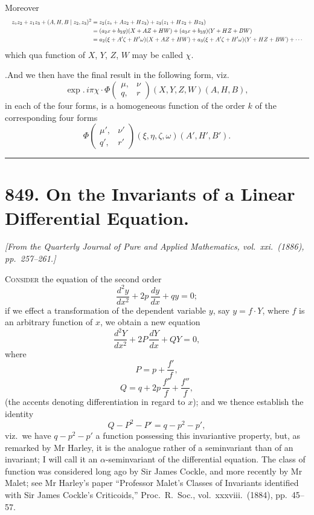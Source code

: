 \documentclass[11pt]{article}
\begin{document}
Moreover
\[
\resizebox{\textwidth}{!}{$\displaystyle
\begin{aligned}
z_{\circ}z_2+z_1z_3+(A,H,B\mid z_2,z_3)^2 &= z_2(z_{\circ}+Az_2+Hz_3) + z_3(z_1+Hz_2+Bz_3)\\
&= (a_2x+b_2y)(X+AZ+HW) + (a_3x+b_3y)(Y+HZ+BW)\\
&= a_2(\xi+A'\zeta+H'\omega)(X+AZ+HW) + a_3(\xi+A'\zeta+H'\omega)(Y+HZ+BW) + \dotsb
\end{aligned}$}
\]
which qua function of $X$, $Y$, $Z$, $W$ may be called $\chi$.

\medskip

.\quad And we then have the final result in the following form, viz.
\[
\exp.\,i\pi\chi\cdot\Phi\!\begin{pmatrix} \mu, & \nu \\ q, & r \end{pmatrix}\!(X,Y,Z,W)(A,H,B),
\]
in each of the four forms, is a homogeneous function of the order $k$ of the corresponding four forms
\[
\Phi\!\begin{pmatrix} \mu', & \nu' \\ q', & r' \end{pmatrix}\!(\xi,\eta,\zeta,\omega)(A',H',B').
\]

\bigskip\bigskip
\hrule
\bigskip

\section*{849. On the Invariants of a Linear Differential Equation.}

\noindent\textit{[From the Quarterly Journal of Pure and Applied Mathematics, vol.\ xxi.\ (1886), pp.\ 257--261.]}

\medskip

\noindent\textsc{Consider} the equation of the second order
\[
\frac{d^2y}{dx^2} + 2p\,\frac{dy}{dx} + qy = 0;
\]
if we effect a transformation of the dependent variable $y$, say $y = f\cdot Y$, where $f$ is an arbitrary function of $x$, we obtain a new equation
\[
\frac{d^2Y}{dx^2} + 2P\,\frac{dY}{dx} + QY = 0,
\]
where
\[
P = p + \frac{f'}{f},
\]
\[
Q = q + 2p\,\frac{f'}{f} + \frac{f''}{f},
\]
(the accents denoting differentiation in regard to $x$); and we thence establish the identity
\[
Q - P^2 - P' = q - p^2 - p',
\]
viz.\ we have $q - p^2 - p'$ a function possessing this invariantive property, but, as remarked by Mr Harley, it is the analogue rather of a seminvariant than of an invariant; I will call it an $\alpha$-seminvariant of the differential equation. The class of function was considered long ago by Sir James Cockle, and more recently by Mr Malet; see Mr Harley's paper ``Professor Malet's Classes of Invariants identified with Sir James Cockle's Criticoids,'' Proc.\ R.\ Soc., vol.\ xxxviii.\ (1884), pp.\ 45--57.
\end{document}
